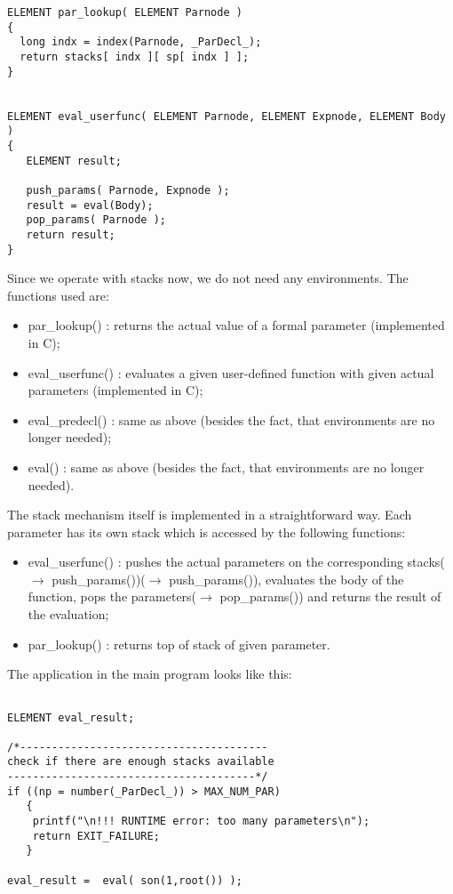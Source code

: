 \pagebreak
\begin{verbatim}
ELEMENT par_lookup( ELEMENT Parnode )
{
  long indx = index(Parnode, _ParDecl_);
  return stacks[ indx ][ sp[ indx ] ];
}


ELEMENT eval_userfunc( ELEMENT Parnode, ELEMENT Expnode, ELEMENT Body )
{
   ELEMENT result;

   push_params( Parnode, Expnode );
   result = eval(Body);    
   pop_params( Parnode );
   return result; 
}

\end{verbatim}
Since we operate with stacks now, we do not need any environments. The functions used are:
\begin{itemize}
\item par\_lookup() : returns the actual value of a formal parameter (implemented in C);
\item eval\_userfunc() : evaluates a given user-defined function with given actual parameters (implemented in C);
\item eval\_predecl() : same as above (besides the fact, that environments are no longer needed);
\item eval() : same as above (besides the fact, that environments are no longer needed).
\end{itemize}
The stack mechanism itself is implemented in a straightforward way. Each parameter has its own stack which is accessed by the following functions:
\begin{itemize}
\item eval\_userfunc() : pushes the actual parameters on the corresponding stacks($\rightarrow$ push\_params())($\rightarrow$ push\_params()), evaluates the body of the function, pops the parameters($\rightarrow$ pop\_params()) and returns the result of the evaluation;
\item par\_lookup() : returns top of stack of given parameter.
\end{itemize}
The application in the main program looks like this:
\pagebreak
\begin{verbatim}

ELEMENT eval_result;

/*---------------------------------------
check if there are enough stacks available
---------------------------------------*/
if ((np = number(_ParDecl_)) > MAX_NUM_PAR)
   { 
    printf("\n!!! RUNTIME error: too many parameters\n");
    return EXIT_FAILURE;
   }

eval_result =  eval( son(1,root()) );

\end{verbatim}

